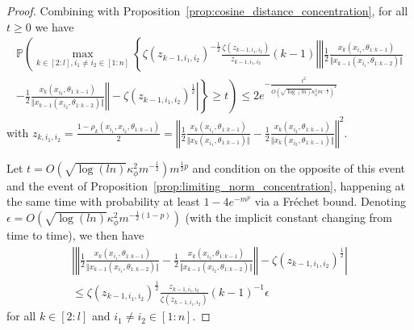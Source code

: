 \documentclass[twoside,11pt]{article}
\newcommand{\Prob}{\mathbb{P}}
\begin{document}
\begin{proof}
Combining \citet[Lemma~2.2.2]{Vandervaartetal2023} with Proposition~\ref{prop:cosine_distance_concentration}, for all $t \geq 0$ we have
\begin{multline*}
\Prob\left( \max_{k \in [2:l], i_1 \neq i_2 \in [1:n]}\left\{ \zeta(z_{k-1,i_1,i_2})^{-\frac{1}{2}} \frac{\zeta(z_{k-1,i_1,i_2})}{z_{k-1,i_1,i_2}} (k-1) \left\vert \left\Vert \frac{1}{2} \frac{x_k(x_{i_1}, \theta_{1 : k-1})}{\Vert x_{k-1}(x_{i_1}, \theta_{1 : k-2}) \Vert} 
\right. \right. \right. \right. \\ \left. \left. \left. \left.
- \frac{1}{2} \frac{x_k(x_{i_2}, \theta_{1 : k-1})}{\Vert x_{k-1}(x_{i_2}, \theta_{1 : k-2}) \Vert} \right\Vert - \zeta(z_{k-1,i_1,i_2})^{\frac{1}{2}} \right\vert \right\} \geq t \right)
\leq 2e^{-\frac{t^2}{O\left( \sqrt{\log(ln)} \kappa_\phi^2 m^{-\frac{1}{2}} \right)^2}}
\end{multline*}
with $z_{k,i_1,i_2} = \frac{1 - \rho_k(x_{i_1},x_{i_2},\theta_{1:k-1})}{2} = \left\Vert \frac{1}{2} \frac{x_k(x_{i_1}, \theta_{1 : k-1})}{\Vert x_k(x_{i_1}, \theta_{1 : k-1}) \Vert} - \frac{1}{2} \frac{x_k(x_{i_2}, \theta_{1 : k-1})}{\Vert x_k(x_{i_2}, \theta_{1 : k-1}) \Vert} \right\Vert^2$.

Let $t = O(\sqrt{\log(ln)} \kappa_\phi^2 m^{-\frac{1}{2}}) m^{\frac{1}{2}p}$ and condition on the opposite of this event and the event of Proposition~\ref{prop:limiting_norm_concentration}, happening at the same time with probability at least $1 - 4e^{-m^p}$ via a Fr\'echet bound. Denoting $\epsilon = O\left( \sqrt{\log(ln)} \kappa_\phi^2 m^{-\frac{1}{2}(1-p)} \right)$ (with the implicit constant changing from time to time), we then have
\begin{multline}\label{eq:limiting_cosine_distance_concentration}
\left\vert \left\Vert \frac{1}{2} \frac{x_k(x_{i_1}, \theta_{1 : k-1})}{\Vert x_{k-1}(x_{i_1}, \theta_{1 : k-2}) \Vert} - \frac{1}{2} \frac{x_k(x_{i_2}, \theta_{1 : k-1})}{\Vert x_{k-1}(x_{i_2}, \theta_{1 : k-2}) \Vert} \right\Vert - \zeta(z_{k-1,i_1,i_2})^{\frac{1}{2}} \right\vert \\
\leq \zeta(z_{k-1,i_1,i_2})^{\frac{1}{2}} \frac{z_{k-1,i_1,i_2}}{\zeta(z_{k-1,i_1,i_2})} (k-1)^{-1} \epsilon
\end{multline}
for all $k \in [2:l]$ and $i_1 \neq i_2 \in [1:n]$.


\end{proof}
\end{document}
